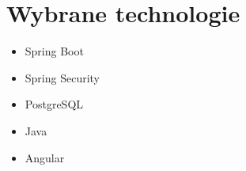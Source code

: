 \section{Wybrane technologie}
\begin{itemize}
    \item Spring Boot
    \item Spring Security
    \item PostgreSQL
    \item Java
    \item Angular
\end{itemize}
